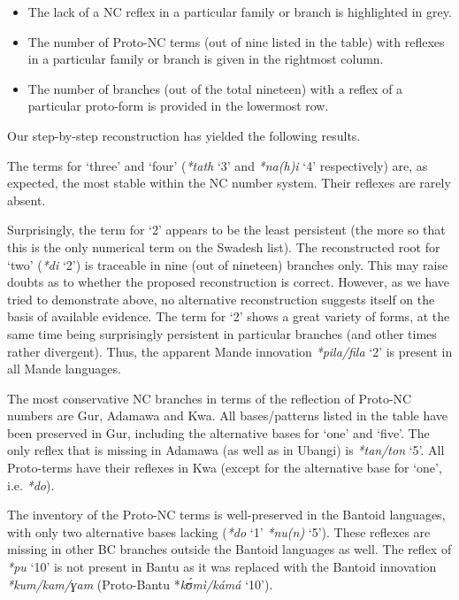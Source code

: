 \begin{itemize}
\item  The lack of a NC reflex in a particular family or branch is highlighted in grey.
\item  The number of Proto-NC terms (out of nine listed in the table) with reflexes in a particular family or branch is given in the rightmost column.
\item  The number of branches (out of the total nineteen) with a reflex of a particular proto-form is provided in the lowermost row.
\end{itemize}
Our step-by-step reconstruction has yielded the following results.

The terms for ‘three’ and ‘four’ (\textit{*tath} ‘3’ and \textit{*na}\textit{(h}\textit{)i} ‘4’ respectively) are, as expected, the most stable within the NC number system. Their reflexes are rarely absent.

Surprisingly, the term for ‘2’ appears to be the least persistent (the more so that this is the only numerical term on the Swadesh list). The reconstructed root for ‘two’ (\textit{*di} ‘2’) is traceable in nine (out of nineteen) branches only. This may raise doubts as to whether the proposed reconstruction is correct. However, as we have tried to demonstrate above, no alternative reconstruction suggests itself on the basis of available evidence. The term for ‘2’ shows a great variety of forms, at the same time being surprisingly persistent in particular branches (and other times rather divergent). Thus, the apparent Mande innovation \textit{*pila}\textit{/fila} ‘2’ is present in all Mande languages.

The most conservative NC branches in terms of the reflection of Proto-NC numbers are Gur, Adamawa and Kwa. All bases/patterns listed in the table have been preserved in Gur, including the alternative bases for ‘one’ and ‘five’. The only reflex that is missing in Adamawa (as well as in Ubangi) is \textit{*tan/ton} ‘5’. All Proto-terms have their reflexes in Kwa (except for the alternative base for ‘one’, i.e. \textit{*do}).

The inventory of the Proto-NC terms is well-preserved in the Bantoid languages, with only two alternative bases lacking (\textit{*do} ‘1’  \textit{*nu(n)} ‘5’). These reflexes are missing in other BC branches outside the Bantoid languages as well. The reflex of \textit{*pu} ‘10’ is not present in Bantu as it was replaced with the Bantoid innovation \textit{*kum/kam/ɣam} (Proto-Bantu *\textit{k{\'{ʊ}}mì/kámá} ‘10’).

